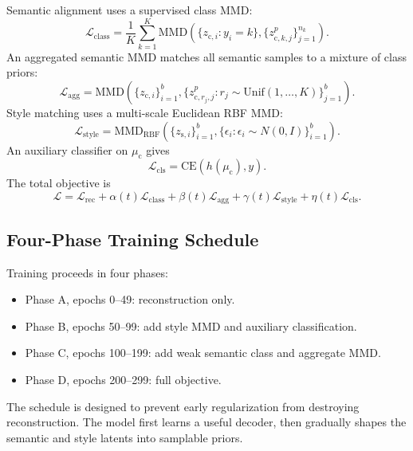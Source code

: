 \documentclass[10pt]{article}
\begin{document}
Semantic alignment uses a supervised class MMD:
\begin{equation}
    \mathcal{L}_{\mathrm{class}}
    =
    \frac{1}{K}\sum_{k=1}^{K}
    \mathrm{MMD}\left(
        \{z_{\mathrm{c},i}:y_i=k\},
        \{z_{\mathrm{c},k,j}^{p}\}_{j=1}^{n_k}
    \right).
\end{equation}
An aggregated semantic MMD matches all semantic samples to a mixture of class priors:
\begin{equation}
    \mathcal{L}_{\mathrm{agg}}
    =
    \mathrm{MMD}\left(
        \{z_{\mathrm{c},i}\}_{i=1}^{b},
        \{z_{\mathrm{c},r_j,j}^{p}:r_j\sim\mathrm{Unif}(1,\dots,K)\}_{j=1}^{b}
    \right).
\end{equation}
Style matching uses a multi-scale Euclidean RBF MMD:
\begin{equation}
    \mathcal{L}_{\mathrm{style}}
    =
    \mathrm{MMD}_{\mathrm{RBF}}
    \left(\{z_{\mathrm{s},i}\}_{i=1}^{b},\{\epsilon_i:\epsilon_i\sim N(0,I)\}_{i=1}^{b}\right).
\end{equation}
An auxiliary classifier on $\mu_{\mathrm{c}}$ gives
\begin{equation}
    \mathcal{L}_{\mathrm{cls}}
    =
    \mathrm{CE}(h(\mu_{\mathrm{c}}),y).
\end{equation}
The total objective is
\begin{equation}
    \mathcal{L} =
    \mathcal{L}_{\mathrm{rec}}
    + \alpha(t)\mathcal{L}_{\mathrm{class}}
    + \beta(t)\mathcal{L}_{\mathrm{agg}}
    + \gamma(t)\mathcal{L}_{\mathrm{style}}
    + \eta(t)\mathcal{L}_{\mathrm{cls}}.
\end{equation}

\subsection{Four-Phase Training Schedule}

Training proceeds in four phases:
\begin{itemize}
    \item Phase A, epochs 0--49: reconstruction only.
    \item Phase B, epochs 50--99: add style MMD and auxiliary classification.
    \item Phase C, epochs 100--199: add weak semantic class and aggregate MMD.
    \item Phase D, epochs 200--299: full objective.
\end{itemize}
The schedule is designed to prevent early regularization from destroying reconstruction. The model first learns a useful decoder, then gradually shapes the semantic and style latents into samplable priors.
\end{document}
